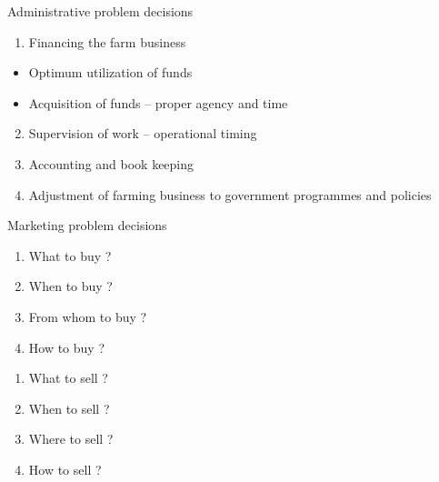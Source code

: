 \documentclass[12pt,ignorenonframetext,aspectratio=169]{beamer}
\providecommand{\tightlist}{%
  \setlength{\itemsep}{0pt}\setlength{\parskip}{0pt}}
\begin{document}
\begin{frame}{Administrative problem decisions}
\protect\hypertarget{administrative-problem-decisions}{}

\begin{block}{}

\begin{enumerate}
\tightlist
\item
  Financing the farm business
\end{enumerate}

\begin{itemize}
\tightlist
\item
  Optimum utilization of funds
\item
  Acquisition of funds -- proper agency and time
\end{itemize}

\begin{enumerate}
\setcounter{enumi}{1}
\tightlist
\item
  Supervision of work -- operational timing
\item
  Accounting and book keeping
\item
  Adjustment of farming business to government programmes and policies
\end{enumerate}

\end{block}

\end{frame}

\begin{frame}{Marketing problem decisions}
\protect\hypertarget{marketing-problem-decisions}{}

\begin{block}{}

\begin{enumerate}
\tightlist
\item
  What to buy ?
\item
  When to buy ?
\item
  From whom to buy ?
\item
  How to buy ?
\end{enumerate}

\end{block}

\begin{block}{}

\begin{enumerate}
\tightlist
\item
  What to sell ?
\item
  When to sell ?
\item
  Where to sell ?
\item
  How to sell ?
\end{enumerate}

\end{block}

\end{frame}
\end{document}
